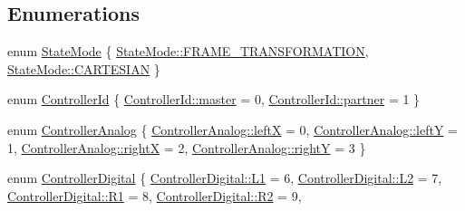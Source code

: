 \subsection*{Enumerations}
\begin{DoxyCompactItemize}
\item 
enum \mbox{\hyperlink{namespaceokapi_af37fbd761bd859a00ff4dd4a87dd8c07}{State\+Mode}} \{ \mbox{\hyperlink{namespaceokapi_af37fbd761bd859a00ff4dd4a87dd8c07ad5ed7666e5cebf60d3af20a5a46edf3b}{State\+Mode\+::\+F\+R\+A\+M\+E\+\_\+\+T\+R\+A\+N\+S\+F\+O\+R\+M\+A\+T\+I\+ON}}, 
\mbox{\hyperlink{namespaceokapi_af37fbd761bd859a00ff4dd4a87dd8c07ac02304094f2866a43251b12946a9a21b}{State\+Mode\+::\+C\+A\+R\+T\+E\+S\+I\+AN}}
 \}
\item 
enum \mbox{\hyperlink{namespaceokapi_a56349a0562b06c6ffc742e94cb1e4361}{Controller\+Id}} \{ \mbox{\hyperlink{namespaceokapi_a56349a0562b06c6ffc742e94cb1e4361aeb0a191797624dd3a48fa681d3061212}{Controller\+Id\+::master}} = 0, 
\mbox{\hyperlink{namespaceokapi_a56349a0562b06c6ffc742e94cb1e4361a7454739e907f5595ae61d84b8547f574}{Controller\+Id\+::partner}} = 1
 \}
\item 
enum \mbox{\hyperlink{namespaceokapi_afcc83d6a64f075a4dba212ff612c31d0}{Controller\+Analog}} \{ \mbox{\hyperlink{namespaceokapi_afcc83d6a64f075a4dba212ff612c31d0a997e1d811ca293735c9a6d41c9f4e161}{Controller\+Analog\+::leftX}} = 0, 
\mbox{\hyperlink{namespaceokapi_afcc83d6a64f075a4dba212ff612c31d0a37239bd194b054def4a166c505e86ca0}{Controller\+Analog\+::leftY}} = 1, 
\mbox{\hyperlink{namespaceokapi_afcc83d6a64f075a4dba212ff612c31d0a94088c1fced51079ed44e8ba1dcc75f3}{Controller\+Analog\+::rightX}} = 2, 
\mbox{\hyperlink{namespaceokapi_afcc83d6a64f075a4dba212ff612c31d0ac20bbbc67cdeace3cad45d4afd635695}{Controller\+Analog\+::rightY}} = 3
 \}
\item 
enum \mbox{\hyperlink{namespaceokapi_af5040b3f1f33d27698871423e1453ab6}{Controller\+Digital}} \{ \newline
\mbox{\hyperlink{namespaceokapi_af5040b3f1f33d27698871423e1453ab6a9ec4c0afd450ceac7adb81c3bcfc9732}{Controller\+Digital\+::\+L1}} = 6, 
\mbox{\hyperlink{namespaceokapi_af5040b3f1f33d27698871423e1453ab6a7e6aa2d53f6ee2b1a34b017fa403cb76}{Controller\+Digital\+::\+L2}} = 7, 
\mbox{\hyperlink{namespaceokapi_af5040b3f1f33d27698871423e1453ab6acda522d4353b166cc2dee84673307b4e}{Controller\+Digital\+::\+R1}} = 8, 
\mbox{\hyperlink{namespaceokapi_af5040b3f1f33d27698871423e1453ab6a8c6d22ff6f63fc6711cfa315cb80b314}{Controller\+Digital\+::\+R2}} = 9, 
\newline

\end{DoxyCompactItemize}
